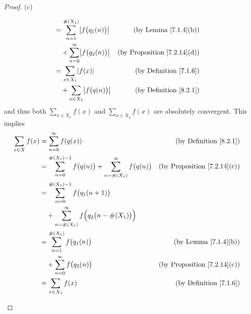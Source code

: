 \begin{proof}{(c)}
\begin{itemize}
\begin{align*}
                                             & = \sum_{n = 1}^{\#(X_1)} \abs*{f\big(q_1(n)\big)}                                                      & \text{(by Lemma \ref{7.1.4}(b))}        \\
                                             & \quad + \sum_{n = 0}^\infty \abs*{f\big(q_2(n)\big)}                                                   & \text{(by Proposition \ref{7.2.14}(d))} \\
                                             & = \sum_{x \in X_1} \abs*{f(x)}                                                                         & \text{(by Definition \ref{7.1.6})}      \\
                                             & \quad + \sum_{x \in X_2} \abs*{f\big(q(n)\big)}                                                        & \text{(by Definition \ref{8.2.1})}
              \end{align*}
              and thus both \(\sum_{x \in X_1} f(x)\) and \(\sum_{x \in X_2} f(x)\) are absolutely convergent.
              This implies
              \begin{align*}
                  \sum_{x \in X} f(x) & = \sum_{n = 0}^\infty f(q(x))                                                            & \text{(by Definition \ref{8.2.1})}      \\
                                      & = \sum_{n = 0}^{\#(X_1) - 1} f\big(q(n)\big) + \sum_{n = \#(X_1)}^\infty f\big(q(n)\big) & \text{(by Proposition \ref{7.2.14}(c))} \\
                                      & = \sum_{n = 0}^{\#(X_1) - 1} f\big(q_1(n + 1)\big)                                                                                 \\
                                      & \quad + \sum_{n = \#(X_1)}^\infty f\Big(q_2\big(n - \#(X_1)\big)\Big)                                                              \\
                                      & = \sum_{n = 1}^{\#(X_1)} f\big(q_1(n)\big)                                               & \text{(by Lemma \ref{7.1.4}(b))}        \\
                                      & \quad + \sum_{n = 0}^\infty f\big(q_2(n)\big)                                            & \text{(by Proposition \ref{7.2.14}(c))} \\
                                      & = \sum_{x \in X_1} f(x)                                                                  & \text{(by Definition \ref{7.1.6})}      \\

\end{align*}
\end{itemize}
\end{proof}
